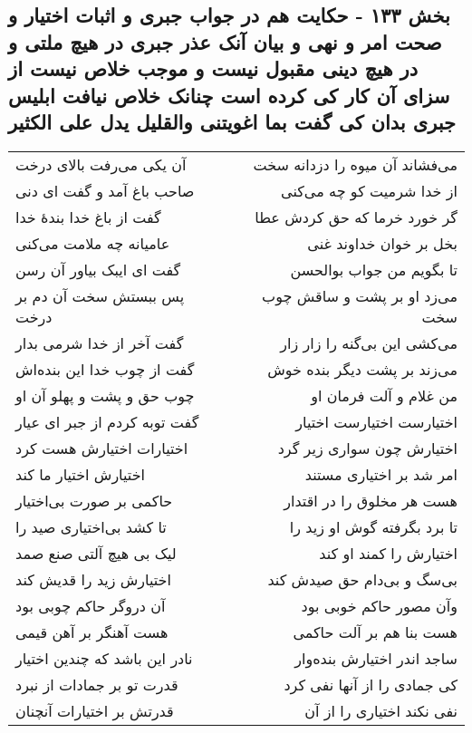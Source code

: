 \begin{center}
\section*{بخش ۱۳۳ - حکایت هم در جواب جبری و اثبات اختیار و صحت امر و نهی و بیان آنک عذر جبری در هیچ ملتی و در هیچ دینی مقبول نیست و موجب خلاص نیست از سزای آن کار  کی کرده است چنانک خلاص نیافت ابلیس جبری بدان کی گفت بما اغویتنی والقلیل یدل علی الکثیر}
\label{sec:sh133}
\begin{longtable}{l p{0.5cm} r}
آن یکی می‌رفت بالای درخت
&&
می‌فشاند آن میوه را دزدانه سخت
\\
صاحب باغ آمد و گفت ای دنی
&&
از خدا شرمیت کو چه می‌کنی
\\
گفت از باغ خدا بندهٔ خدا
&&
گر خورد خرما که حق کردش عطا
\\
عامیانه چه ملامت می‌کنی
&&
بخل بر خوان خداوند غنی
\\
گفت ای ایبک بیاور آن رسن
&&
تا بگویم من جواب بوالحسن
\\
پس ببستش سخت آن دم بر درخت
&&
می‌زد او بر پشت و ساقش چوب سخت
\\
گفت آخر از خدا شرمی بدار
&&
می‌کشی این بی‌گنه را زار زار
\\
گفت از چوب خدا این بنده‌اش
&&
می‌زند بر پشت دیگر بنده خوش
\\
چوب حق و پشت و پهلو آن او
&&
من غلام و آلت فرمان او
\\
گفت توبه کردم از جبر ای عیار
&&
اختیارست اختیارست اختیار
\\
اختیارات اختیارش هست کرد
&&
اختیارش چون سواری زیر گرد
\\
اختیارش اختیار ما کند
&&
امر شد بر اختیاری مستند
\\
حاکمی بر صورت بی‌اختیار
&&
هست هر مخلوق را در اقتدار
\\
تا کشد بی‌اختیاری صید را
&&
تا برد بگرفته گوش او زید را
\\
لیک بی هیچ آلتی صنع صمد
&&
اختیارش را کمند او کند
\\
اختیارش زید را قدیش کند
&&
بی‌سگ و بی‌دام حق صیدش کند
\\
آن دروگر حاکم چوبی بود
&&
وآن مصور حاکم خوبی بود
\\
هست آهنگر بر آهن قیمی
&&
هست بنا هم بر آلت حاکمی
\\
نادر این باشد که چندین اختیار
&&
ساجد اندر اختیارش بنده‌وار
\\
قدرت تو بر جمادات از نبرد
&&
کی جمادی را از آنها نفی کرد
\\
قدرتش بر اختیارات آنچنان
&&
نفی نکند اختیاری را از آن

\end{longtable}
\end{center}
